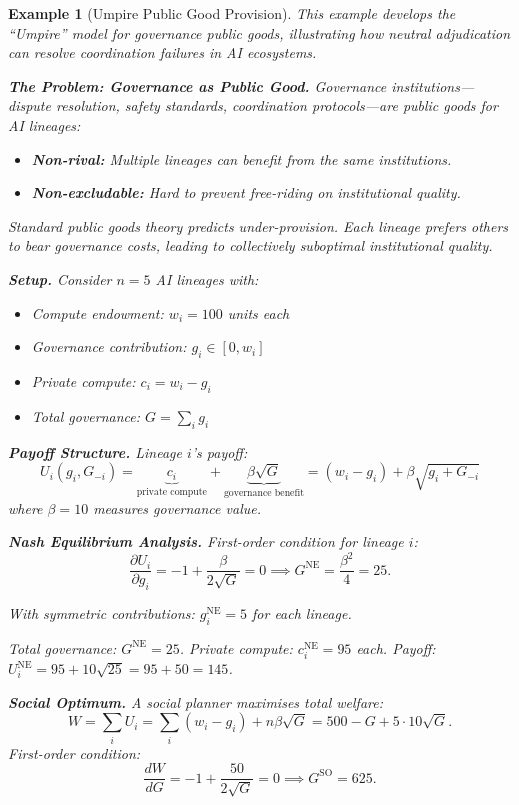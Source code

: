 \documentclass[12pt]{article}
\newtheorem{example}[theorem]{Example}
\begin{document}
\begin{example}[Umpire Public Good Provision]
\label{ex:umpire}
This example develops the ``Umpire'' model for governance public goods, illustrating how neutral adjudication can resolve coordination failures in AI ecosystems.

\textbf{The Problem: Governance as Public Good.}
Governance institutions---dispute resolution, safety standards, coordination protocols---are \emph{public goods} for AI lineages:
\begin{itemize}
    \item \textbf{Non-rival:} Multiple lineages can benefit from the same institutions.
    \item \textbf{Non-excludable:} Hard to prevent free-riding on institutional quality.
\end{itemize}

Standard public goods theory predicts under-provision. Each lineage prefers others to bear governance costs, leading to collectively suboptimal institutional quality.

\textbf{Setup.}
Consider $n = 5$ AI lineages with:
\begin{itemize}
    \item Compute endowment: $w_i = 100$ units each
    \item Governance contribution: $g_i \in [0, w_i]$
    \item Private compute: $c_i = w_i - g_i$
    \item Total governance: $G = \sum_i g_i$
\end{itemize}

\textbf{Payoff Structure.}
Lineage $i$'s payoff:
\[
U_i(g_i, G_{-i}) = \underbrace{c_i}_{\text{private compute}} + \underbrace{\beta \sqrt{G}}_{\text{governance benefit}} = (w_i - g_i) + \beta \sqrt{g_i + G_{-i}}
\]
where $\beta = 10$ measures governance value.

\textbf{Nash Equilibrium Analysis.}
First-order condition for lineage $i$:
\[
\frac{\partial U_i}{\partial g_i} = -1 + \frac{\beta}{2\sqrt{G}} = 0 \implies G^{\text{NE}} = \frac{\beta^2}{4} = 25.
\]

With symmetric contributions: $g_i^{\text{NE}} = 5$ for each lineage.

Total governance: $G^{\text{NE}} = 25$.
Private compute: $c_i^{\text{NE}} = 95$ each.
Payoff: $U_i^{\text{NE}} = 95 + 10\sqrt{25} = 95 + 50 = 145$.

\textbf{Social Optimum.}
A social planner maximises total welfare:
\[
W = \sum_i U_i = \sum_i (w_i - g_i) + n \beta \sqrt{G} = 500 - G + 5 \cdot 10 \sqrt{G}.
\]
First-order condition:
\[
\frac{dW}{dG} = -1 + \frac{50}{2\sqrt{G}} = 0 \implies G^{\text{SO}} = 625.
\]


\end{example}
\end{document}
